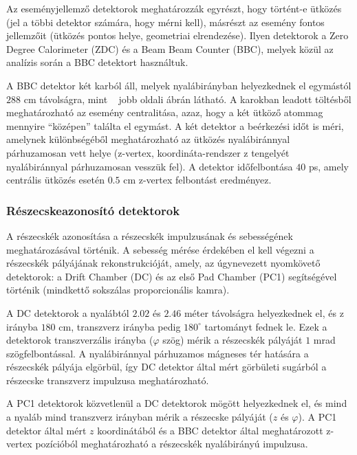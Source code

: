 \documentclass[11pt,a4paper]{article}
\numberwithin{equation}{subsection}
\numberwithin{figure}{section}
\begin{document}
Az eseményjellemző detektorok meghatározzák egyrészt, hogy történt-e ütközés (jel a többi detektor számára, hogy mérni kell), másrészt az esemény fontos jellemzőit (ütközés pontos helye, geometriai elrendezése). Ilyen detektorok a Zero Degree Calorimeter (ZDC) és a Beam Beam Counter (BBC), melyek közül az analízis során a BBC detektort használtuk.

A BBC detektor két karból áll, melyek nyalábirányban helyezkednek el egymástól $288$ cm távolságra, mint ~ jobb oldali ábrán látható. A karokban leadott töltésből meghatározható az esemény centralitása, azaz, hogy a két ütköző atommag mennyire ``középen'' találta el egymást. A két detektor a beérkezési időt is méri, amelynek különbségéből meghatározható az ütközés nyalábiránnyal párhuzamosan vett helye (z-vertex, koordináta-rendszer z tengelyét nyalábiránnyal párhuzamosan vesszük fel). A detektor időfelbontása $40$ ps, amely centrális ütközés esetén $0.5$ cm z-vertex felbontást eredményez.
 
\subsubsection{Részecskeazonosító detektorok}\label{sec:phenix2}

A részecskék azonosítása a részecskék impulzusának és sebességének meghatározásával történik. A sebesség mérése érdekében el kell végezni a részecskék pályájának rekonstrukcióját, amely, az úgynevezett nyomkövető detektorok: a Drift Chamber (DC) és az első Pad Chamber (PC1) segítségével történik (mindkettő sokszálas proporcionális kamra). 

A DC detektorok a nyalábtól $2.02$ és $2.46$ méter távolságra helyezkednek el, és z irányba $180$ cm, transzverz irányba pedig $180^{\circ}$ tartományt fednek le. Ezek a detektorok transzverzális irányba ($\varphi$ szög) mérik a részecskék pályáját $1$ mrad szögfelbontással. A nyalábiránnyal párhuzamos mágneses tér hatására a részecskék pályája elgörbül, így DC detektor által mért görbületi sugárból a részecske transzverz impulzusa meghatározható.

A PC1 detektorok közvetlenül a DC detektorok mögött helyezkednek el, és mind a nyaláb mind transzverz irányban mérik a részecske pályáját ($z$ és $\varphi$). A PC1 detektor által mért $z$ koordinátából és a BBC detektor által meghatározott z-vertex pozícióból meghatározható a részecskék nyalábirányú impulzusa.
\end{document}
